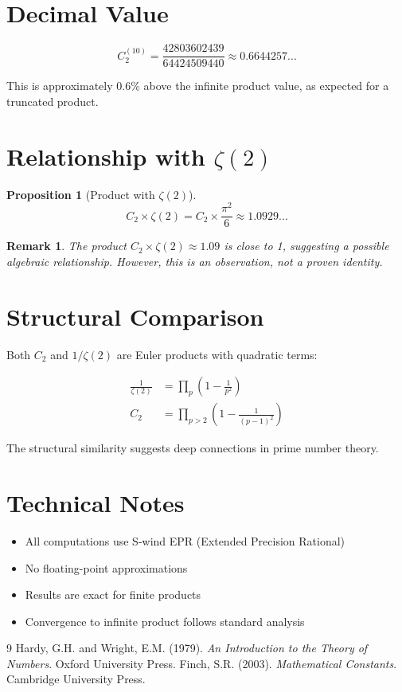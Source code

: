 \documentclass[11pt,a4paper]{article}
\newtheorem{proposition}{Proposition}
\newtheorem{remark}{Remark}
\begin{document}
\section{Decimal Value}

\begin{equation}
C_2^{(10)} = \frac{42803602439}{64424509440} \approx 0.6644257...
\end{equation}

This is approximately 0.6\% above the infinite product value, as expected for a truncated product.

\section{Relationship with $\zeta(2)$}

\begin{proposition}[Product with $\zeta(2)$]
\begin{equation}
C_2 \times \zeta(2) = C_2 \times \frac{\pi^2}{6} \approx 1.0929...
\end{equation}
\end{proposition}

\begin{remark}
The product $C_2 \times \zeta(2) \approx 1.09$ is close to 1, suggesting a possible algebraic relationship. However, this is an observation, not a proven identity.
\end{remark}

\section{Structural Comparison}

Both $C_2$ and $1/\zeta(2)$ are Euler products with quadratic terms:

\begin{align}
\frac{1}{\zeta(2)} &= \prod_{p} \left(1 - \frac{1}{p^2}\right) \\
C_2 &= \prod_{p > 2} \left(1 - \frac{1}{(p-1)^2}\right)
\end{align}

The structural similarity suggests deep connections in prime number theory.

\section{Technical Notes}

\begin{itemize}
    \item All computations use S-wind EPR (Extended Precision Rational)
    \item No floating-point approximations
    \item Results are exact for finite products
    \item Convergence to infinite product follows standard analysis
\end{itemize}

\begin{thebibliography}{9}
 Hardy, G.H. and Wright, E.M. (1979). \textit{An Introduction to the Theory of Numbers}. Oxford University Press.
 Finch, S.R. (2003). \textit{Mathematical Constants}. Cambridge University Press.
\end{thebibliography}
\end{document}

